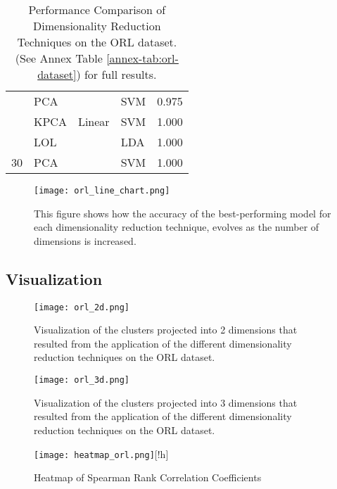 \begin{table}[!h]
\begin{tabular}{llllr}
        \rowcolor{lightgray}\multirow{-3}{*}{15} & PCA            &                & SVM           & 0.975    \\
                                                 & KPCA           & Linear         & SVM           & 1.000    \\
                                                 & LOL            &                & LDA           & 1.000    \\
        \multirow{-3}{*}{30}                     & PCA            &                & SVM           & 1.000    \\
        \bottomrule
    \end{tabular}
    \caption{Performance Comparison of Dimensionality Reduction Techniques on the ORL dataset. (See Annex Table \ref{annex-tab:orl-dataset}) for full results.}
    \label{tab:orl-dataset}
\end{table}

\begin{figure}[!h]
    \centering
    \texttt{[image: orl\_line\_chart.png]}
    \caption{This figure shows how the accuracy of the best-performing model for each dimensionality reduction technique, evolves as the number of dimensions is increased.}
    \label{fig:orl_line_chart}
\end{figure}

\subsection{Visualization}

\begin{figure}[!h]
    \centering
    \texttt{[image: orl\_2d.png]}
    \caption{Visualization of the clusters projected into 2 dimensions that resulted from the application of the different dimensionality reduction techniques on the ORL dataset.}
    \label{fig:orl-2d}
\end{figure}

\begin{figure}[!h]
    \centering
    \texttt{[image: orl\_3d.png]}
    \caption{Visualization of the clusters projected into 3 dimensions that resulted from the application of the different dimensionality reduction techniques on the ORL dataset.}
    \label{fig:orl-3d}
\end{figure}

\begin{figure}
    \centering
    \texttt{[image: heatmap\_orl.png]}[!h]
    \caption{Heatmap of Spearman Rank Correlation Coefficients}
    \label{fig:heatmap-orl}
\end{figure}

